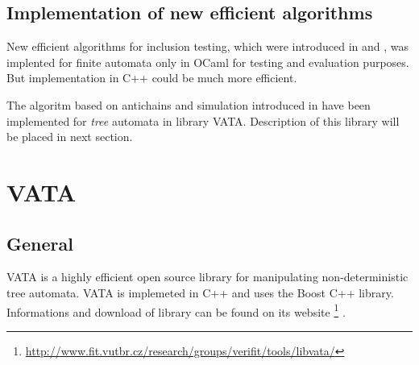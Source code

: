 \subsection{Implementation of new efficient algorithms}
New efficient algorithms for inclusion testing, which were introduced in \cite{antichain} and \cite{congr}, was implented for finite automata 
only in OCaml for testing and evaluation purposes. But implementation in C++ could be much more efficient.

The algoritm based on antichains and simulation introduced in \cite{antichain} have been implemented for \emph{tree} automata in library VATA. Description
of this library will be placed in next section.

\begin{comment}
For finite automata manipulation exists many different libraries. Libraries have different purposes and are implemented in different languages, 
e.g. estabilished package of Java \emph{dk.brics.automaton} \cite{brics}, \cite{antichains}, which is also reimplemented for C in \emph{libfa} \cite{libfa} 
and for C\# in \emph{Fare} \cite{fare}. Another libraries are \emph{The RWTH FSA toolkit} \cite{rwth} in C++, which also supports weighted automata, or
\emph{FSA Utilities toolbox} \cite{fsaprolog} in Prolog.

This is not definitely complete enumaration of finite automata libraries, but just few examples. Their main problem is that they do not contain 
the efficient inclusion testing. On the other side, new efficient algorithms introduced in \cite{antichain} and in \cite{congr} have been for finite automata
implemented only in OCaml and implementation in C++ could be much more efficient.

Because of these reasons, algorithms for finite automata manipulation will be implemented as extension of VATA (library for tree automata manipulation) in C++.
\end{comment}

\section{VATA}
\label{VATA}
\subsection{General}
VATA is a highly efficient open source library for manipulating non-deterministic tree automata. 
VATA is implemeted in C++ and uses the Boost C++ library. Informations and download of library can be found on its website 
\footnote{\url{http://www.fit.vutbr.cz/research/groups/verifit/tools/libvata/}} \cite{libvata}. 
